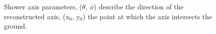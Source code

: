 \begin{figure}[p]
\centerline{}
\caption{\label{FIG::VERITAS::SHOWERAXISPARAM} Shower axis parameters, 
($\theta$, $\phi$) describe the direction of the reconstructed axis, 
(x$_0$, y$_0$) the point at which the axis intersects the ground.}
\end{figure}

